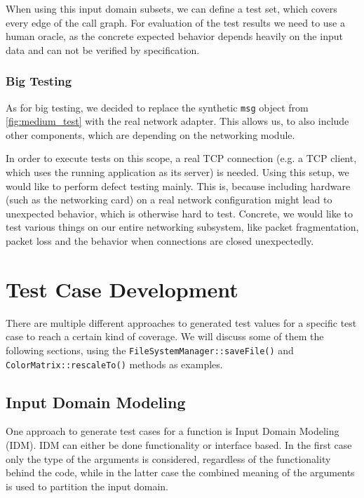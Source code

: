 \documentclass{scrreprt}
\begin{document}
When using this input domain subsets, we can define a test set, which covers every edge of the call graph. For evaluation of the test results we need to use a human oracle, as the concrete expected behavior depends heavily on the input data and can not be verified by specification.

\subsubsection{Big Testing}

As for big testing, we decided to replace the synthetic \texttt{msg} object from \vref{fig:medium_test} with the real network adapter. This allows us, to also include other components, which are depending on the networking module.

In order to execute tests on this scope, a real TCP connection (e.g. a TCP client, which uses the running application as its server) is needed. Using this setup, we would like to perform defect testing mainly. This is, because including hardware (such as the networking card) on a real network configuration might lead to unexpected behavior, which is otherwise hard to test. Concrete, we would like to test various things on our entire networking subsystem, like packet fragmentation, packet loss and the behavior when connections are closed unexpectedly. %

\section{Test Case Development}

There are multiple different approaches to generated test values for a specific test case to reach a certain kind of coverage. We will discuss some of them the following sections, using the \texttt{FileSystemManager::saveFile()} and  \texttt{ColorMatrix::rescaleTo()} methods as examples.

\subsection{Input Domain Modeling}

One approach to generate test cases for a function is Input Domain Modeling (IDM). IDM can either be done functionality or interface based. In the first case only the type of the arguments is considered, regardless of the functionality behind the code, while in the latter case the combined meaning of the arguments is used to partition the input domain.
\end{document}
